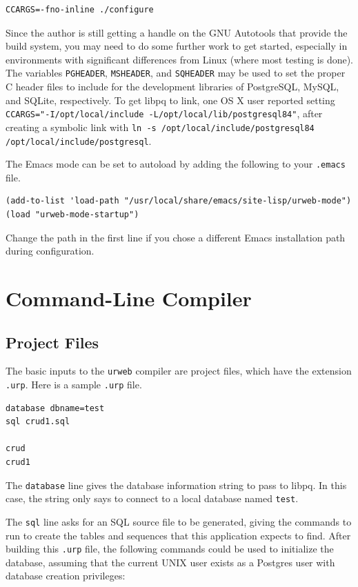 \documentclass{article}
\begin{document}
\begin{verbatim}
CCARGS=-fno-inline ./configure
\end{verbatim}

Since the author is still getting a handle on the GNU Autotools that provide the build system, you may need to do some further work to get started, especially in environments with significant differences from Linux (where most testing is done).  The variables \texttt{PGHEADER}, \texttt{MSHEADER}, and \texttt{SQHEADER} may be used to set the proper C header files to include for the development libraries of PostgreSQL, MySQL, and SQLite, respectively.  To get libpq to link, one OS X user reported setting \texttt{CCARGS="-I/opt/local/include -L/opt/local/lib/postgresql84"}, after creating a symbolic link with \texttt{ln -s /opt/local/include/postgresql84 /opt/local/include/postgresql}.

The Emacs mode can be set to autoload by adding the following to your \texttt{.emacs} file.

\begin{verbatim}
(add-to-list 'load-path "/usr/local/share/emacs/site-lisp/urweb-mode")
(load "urweb-mode-startup")
\end{verbatim}

Change the path in the first line if you chose a different Emacs installation path during configuration.


\section{Command-Line Compiler}

\subsection{\label{cl}Project Files}

The basic inputs to the \texttt{urweb} compiler are project files, which have the extension \texttt{.urp}.  Here is a sample \texttt{.urp} file.

\begin{verbatim}
database dbname=test
sql crud1.sql

crud
crud1
\end{verbatim}

The \texttt{database} line gives the database information string to pass to libpq.  In this case, the string only says to connect to a local database named \texttt{test}.

The \texttt{sql} line asks for an SQL source file to be generated, giving the commands to run to create the tables and sequences that this application expects to find.  After building this \texttt{.urp} file, the following commands could be used to initialize the database, assuming that the current UNIX user exists as a Postgres user with database creation privileges:
\end{document}
